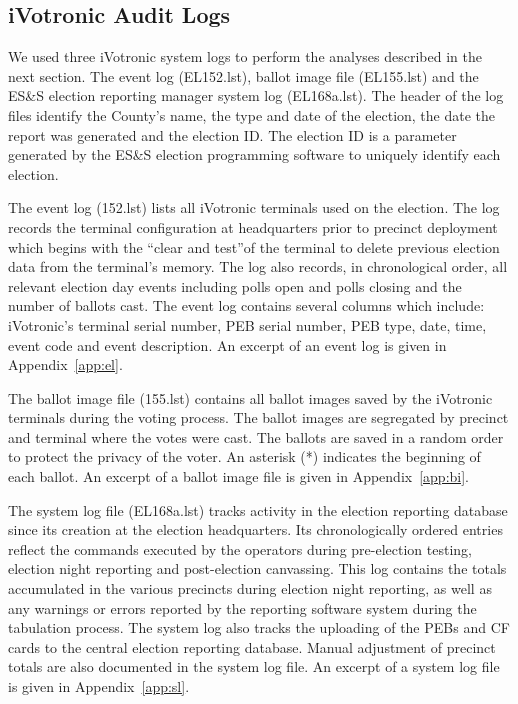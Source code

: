 \subsection{iVotronic Audit Logs}
We used three iVotronic system logs to perform the analyses described in the next section. The event log (EL152.lst), ballot image file (EL155.lst) and the ES\&S election reporting manager system log (EL168a.lst).  The header of the log files identify the County's name, the type and date of the election, the date the report was generated and the election ID. The election ID is a parameter generated by the ES\&S election programming software to uniquely identify each election.

The event log (152.lst) lists all iVotronic terminals used on the election. The log records the terminal configuration at headquarters prior to precinct deployment which begins with the \textquotedblleft clear and test\textquotedblright of the terminal to delete previous election data from the terminal\textquoteright s memory. The log also records, in chronological order, all relevant election day events including polls open and polls closing and the number of ballots cast.  The event log contains several columns which include: iVotronic's terminal serial number, PEB serial number, PEB type, date, time, event code and event description. An excerpt of  an event log is given in Appendix~\ref{app:el}.

The ballot image file (155.lst) contains all ballot images saved by the iVotronic terminals during the voting process. The ballot images are segregated by precinct and terminal where the votes were cast. The ballots are saved in a random order to protect the privacy of the voter. An asterisk (*) indicates the beginning of each ballot. An excerpt of a ballot image file is given in Appendix~\ref{app:bi}.

The system log file (EL168a.lst) tracks activity in the election reporting database since its creation at the election headquarters. Its chronologically ordered entries reflect the commands executed by the operators during  pre-election testing, election night reporting and post-election canvassing. This log contains the totals accumulated in the various precincts during election night reporting, as well as any warnings or errors reported by the reporting software system during the tabulation process. The system log also tracks the uploading of the PEBs and CF cards to the central election reporting database. Manual adjustment of precinct totals are also documented in the system log file. An excerpt of a system log file is given in Appendix~\ref{app:sl}.
